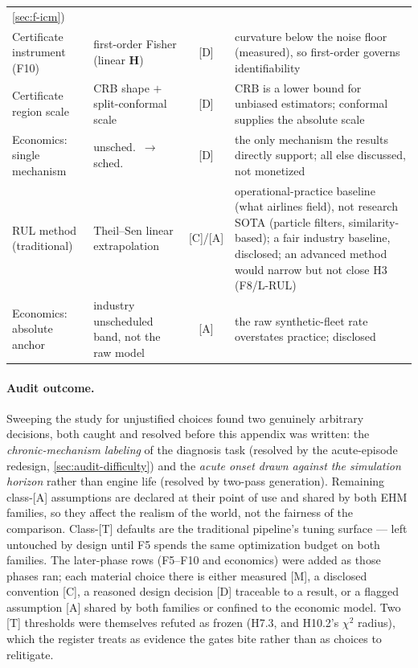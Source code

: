 \begin{center}
\begin{tabular}{>{\raggedright\arraybackslash}p{}>{\raggedright\arraybackslash}p{}c>{\raggedright\arraybackslash}p{}}
    \cref{sec:f-icm}) \\
  Certificate instrument (F10) & first-order Fisher (linear $\mathbf{H}$) & [D] & curvature
    below the noise floor (measured), so first-order governs identifiability \\
  Certificate region scale & CRB shape $+$ split-conformal scale & [D] & CRB is a lower bound
    for unbiased estimators; conformal supplies the absolute scale \\
  Economics: single mechanism & unsched.\ $\to$ sched.\ & [D] & the only
    mechanism the results directly support; all else discussed, not monetized \\
  RUL method (traditional) & Theil--Sen linear extrapolation & [C]/[A] & operational-practice baseline (what airlines field), not research SOTA (particle filters, similarity-based); a fair industry baseline, disclosed; an advanced method would narrow but not close H3 (F8/L-RUL) \\
    Economics: absolute anchor & industry unscheduled band, not the raw model & [A] & the raw
    synthetic-fleet rate overstates practice; disclosed \\
\bottomrule
\end{tabular}
\end{center}

\paragraph{Audit outcome.} Sweeping the study for unjustified choices found two genuinely
arbitrary decisions, both caught and resolved before this appendix was written: the
\emph{chronic-mechanism labeling} of the diagnosis task (resolved by the acute-episode
redesign, \cref{sec:audit-difficulty}) and the \emph{acute onset drawn against the simulation
horizon} rather than engine life (resolved by two-pass generation). Remaining class-[A]
assumptions are declared at their point of use and shared by both EHM families, so they affect
the realism of the world, not the fairness of the comparison. Class-[T] defaults are the
traditional pipeline's tuning surface --- left untouched by design until F5 spends the same
optimization budget on both families. The later-phase rows (F5--F10 and economics) were added
as those phases ran; each material choice there is either measured [M], a disclosed
convention [C], a reasoned design decision [D] traceable to a result, or a flagged assumption
[A] shared by both families or confined to the economic model. Two [T] thresholds were
themselves refuted as frozen (H7.3, and H10.2's $\chi^2$ radius), which the register treats
as evidence the gates bite rather than as choices to relitigate.
